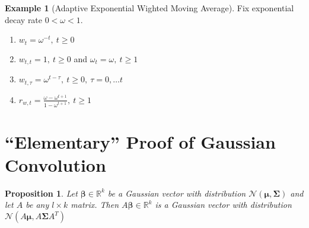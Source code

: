 \documentclass[10pt,fleqn]{amsart}
\newtheorem{proposition}[theorem]{Proposition}
\theoremstyle{definition}
\newtheorem{example}[theorem]{Example}
\theoremstyle{remark}
\numberwithin{equation}{section}
\newcommand{\RR}{\mathbb{R}}
\newcommand{\bbeta}{\boldsymbol{\beta}}
\newcommand{\mmu}{\boldsymbol{\mu}}
\newcommand{\SSigma}{\boldsymbol{\Sigma}}
\begin{document}
\begin{example}[Adaptive Exponential Wighted Moving Average] Fix exponential decay rate $0<\omega<1$.
    \begin{enumerate}
        \item $\displaystyle w_t=\omega^{-t},\ t\geq 0$
        \item $\displaystyle w_{t,t}=1,\ t\geq 0$ and $\omega_t=\omega,\ t\geq 1$
        \item $\displaystyle w_{t,\tau}=\omega^{t-\tau},\ t\geq 0,\ \tau=0,\ldots t$
        \item $\displaystyle r_{w,t}=\frac{\omega-\omega^{t+1}}{1-\omega^{t+1}},\ t\geq 1$
    \end{enumerate}
\end{example}

\appendix\section{``Elementary'' Proof of Gaussian Convolution}\label{appendix_gauss_conv}
\begin{proposition}
    Let $\bbeta\in\RR^k$ be a Gaussian vector with distribution $\mathcal{N}(\mmu,\SSigma)$ and let $A$ be any $l\times k$ matrix.
    Then $A\bbeta\in\RR^k$ is a Gaussian vector with distribution $\mathcal{N}(A\mmu,A\SSigma A^T)$
\end{proposition}
\end{document}
